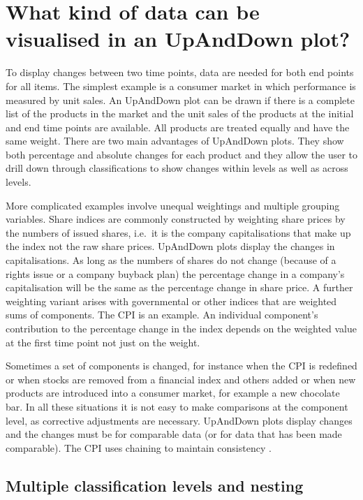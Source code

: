 \hypertarget{what-kind-of-data-can-be-visualised-in-an-upanddown-plot}{%
\section{What kind of data can be visualised in an UpAndDown plot?}\label{what-kind-of-data-can-be-visualised-in-an-upanddown-plot}}

To display changes between two time points, data are needed for both end points for all items. The simplest example is a consumer market in which performance is measured by unit sales. An UpAndDown plot can be drawn if there is a complete list of the products in the market and the unit sales of the products at the initial and end time points are available. All products are treated equally and have the same weight. There are two main advantages of UpAndDown plots. They show both percentage and absolute changes for each product and they allow the user to drill down through classifications to show changes within levels as well as across levels.

More complicated examples involve unequal weightings and multiple grouping variables. Share indices are commonly constructed by weighting share prices by the numbers of issued shares, i.e.~it is the company capitalisations that make up the index not the raw share prices. UpAndDown plots display the changes in capitalisations. As long as the numbers of shares do not change (because of a rights issue or a company buyback plan) the percentage change in a company's capitalisation will be the same as the percentage change in share price. A further weighting variant arises with governmental or other indices that are weighted sums of components. The CPI is an example. An individual component's contribution to the percentage change in the index depends on the weighted value at the first time point not just on the weight.

Sometimes a set of components is changed, for instance when the CPI is redefined or when stocks are removed from a financial index and others added or when new products are introduced into a consumer market, for example a new chocolate bar. In all these situations it is not easy to make comparisons at the component level, as corrective adjustments are necessary. UpAndDown plots display changes and the changes must be for comparable data (or for data that has been made comparable). The CPI uses chaining to maintain consistency \citep{ons:2014}.

\hypertarget{multiple-classification-levels-and-nesting}{%
\subsection{Multiple classification levels and nesting}\label{multiple-classification-levels-and-nesting}}

